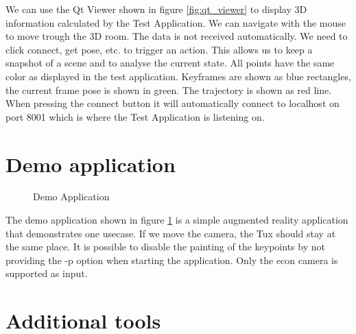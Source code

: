 \documentclass[11pt,a4paper,titlepage,oneside]{report}
\begin{document}
We can use the Qt Viewer shown in figure \ref{fig:qt_viewer} to display 3D information calculated by the Test Application. We can navigate with the mouse to move trough the 3D room. The data is not received automatically. We need to click connect, get pose, etc. to trigger an action. This allows us to keep a snapshot of a scene and to analyse the current state. All points have the same color as displayed in the test application. Keyframes are shown as blue rectangles, the current frame pose is shown in green. The trajectory is shown as red line. When pressing the connect button it will automatically connect to localhost on port 8001 which is where the Test Application is listening on.

\section{Demo application}
\begin{figure}[H]
  \centering
  \qquad
  \caption{Demo Application}\label{fig:demo_application}
\end{figure}

The demo application shown in figure \ref{fig:demo_application} is a simple augmented reality application that demonstrates one usecase. If we move the camera, the Tux should stay at the same place. It is possible to disable the painting of the keypoints by not providing the -p option when starting the application. Only the econ camera is supported as input.

\section{Additional tools}
\end{document}
